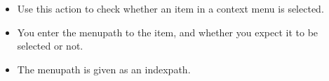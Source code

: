 
\begin{itemize}
\item Use this action to check whether an item in a context menu is selected.
\item You enter the menupath to the item, and whether you expect it to be selected or not.
\item The menupath is given as an indexpath. 
\end{itemize}

